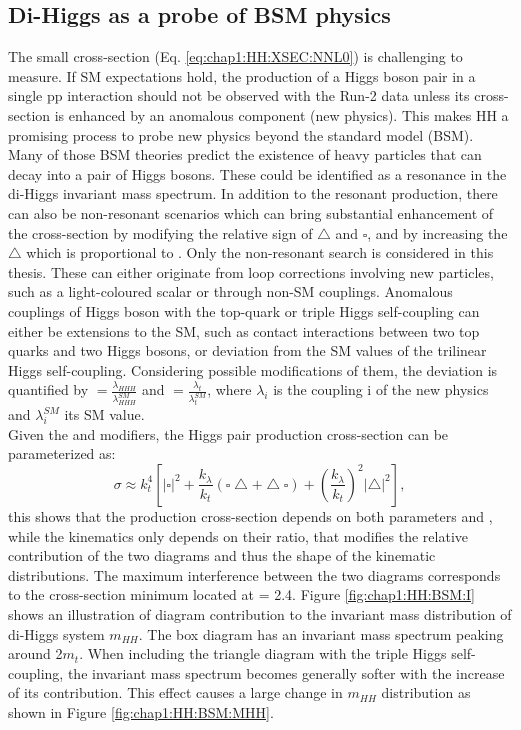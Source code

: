 \subsection{Di-Higgs as a probe of BSM physics}
\label{chap1:HH:BSM}
The small cross-section (Eq. \ref{eq:chap1:HH:XSEC:NNL0}) is challenging to measure. If SM expectations hold, the production of a Higgs boson pair in a single pp interaction should not be observed with the Run-2 data unless its cross-section is enhanced by an anomalous component (new physics). This makes HH a promising process to probe new physics beyond the standard model (BSM). Many of those BSM theories predict the existence of heavy particles that can decay into a pair of Higgs bosons. These could be identified as a resonance in the di-Higgs invariant mass spectrum. In addition to the resonant production, there can also be non-resonant scenarios which can bring substantial enhancement of the cross-section by modifying the relative sign of $\bigtriangleup$ and $\square$, and by increasing the $\bigtriangleup$ which is proportional to \kl. Only the non-resonant search is considered in this thesis. These can either originate from loop corrections involving new particles, such as a light-coloured scalar or through non-SM couplings. Anomalous couplings of Higgs boson with the top-quark or triple Higgs self-coupling can either be extensions to the SM, such as contact interactions between two top quarks and two Higgs bosons, or deviation from the SM values of the trilinear Higgs self-coupling. Considering possible modifications of them, the deviation is quantified by \kl $ = \frac{\lambda_{HHH}}{\lambda_{HHH}^{SM}}$ and \kt $= \frac{\lambda_{t}}{\lambda_{t}^{SM}}$, where $\lambda_{i}$ is the coupling i of the new physics and $\lambda_{i}^{SM}$ its SM value. \\
Given the \kt and \kl modifiers, the Higgs pair production cross-section can be parameterized as:
\begin{equation}
  \sigma \approx k_{t}^{4}\left[|\square|^{2}+\frac{k_{\lambda}}{k_{t}}(\square\bigtriangleup+\bigtriangleup \square)+\left(\frac{k_{\lambda}}{k_{t}}\right)^{2}|\bigtriangleup|^{2}\right], 
  \label{eq:chap1:HH:XSEC:Param}
\end{equation}
this shows that the production cross-section depends on both parameters \kt and \kl, while the kinematics only depends on their ratio, that modifies the relative contribution of the two diagrams and thus the shape of the kinematic distributions. The maximum interference between the two diagrams corresponds to the cross-section minimum located at \kl = 2.4\kt. Figure \ref{fig:chap1:HH:BSM:I} shows an illustration of diagram contribution to the invariant mass distribution of di-Higgs system $m_{HH}$. The box diagram has an invariant mass spectrum peaking around 2$m_t$. When including the triangle diagram with the triple Higgs self-coupling, the invariant mass spectrum becomes generally softer with the increase of its contribution. This effect causes a large change in $m_{HH}$ distribution as shown in Figure \ref{fig:chap1:HH:BSM:MHH}.
